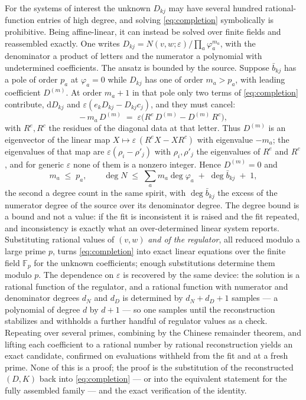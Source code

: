 \documentclass[11pt]{article}
\newcommand{\eps}{\varepsilon}
\newcommand{\dd}{\mathrm{d}}
\newcommand{\Fp}{\mathbb{F}_p}
\begin{document}
For the systems of interest the unknown $D_{kj}$ may have several
hundred rational-function entries of high degree, and solving
\eqref{eq:completion} symbolically is prohibitive.  Being affine-linear,
it
can instead be solved over finite fields and reassembled exactly.
One writes
$D_{kj} = N(v,w;\eps)\big/\prod_a \varphi_a^{m_a}$, with the
denominator a product of letters and the numerator a polynomial with
undetermined coefficients.  The ansatz is bounded by the source.
Suppose $\bar b_{kj}$ has a pole of order $p_a$ at $\varphi_a = 0$
while $D_{kj}$ has one of order $m_a > p_a$, with leading coefficient
$D^{(m)}$.  At order $m_a + 1$ in that pole only two terms of
\eqref{eq:completion} contribute, $\dd D_{kj}$ and
$\eps(e_k D_{kj} - D_{kj}c_j)$, and they must cancel:
\begin{equation}
  -\,m_a\, D^{(m)} \;=\; \eps\big(R^e\,D^{(m)} - D^{(m)}\,R^c\big) ,
\end{equation}
with $R^e, R^c$ the residues of the diagonal data at that letter.
Thus $D^{(m)}$ is an eigenvector of the linear map
$X \mapsto \eps\,(R^eX - XR^c)$ with eigenvalue $-m_a$; the
eigenvalues of that map are $\eps(\rho_i - \rho'_j)$ with
$\rho_i, \rho'_j$ the eigenvalues of $R^e$ and $R^c$, and for generic
$\eps$ none of them is a nonzero integer.  Hence $D^{(m)} = 0$ and
\begin{equation}
  m_a \;\le\; p_a ,
  \qquad
  \deg N \;\le\; \sum_a m_a \deg\varphi_a
  \;+\; \deg\bar b_{kj} \;+\; 1 ,
\end{equation}
the second a degree count in the same spirit, with
$\deg \bar b_{kj}$ the excess of the numerator degree of the source
over its denominator degree.  The degree bound is a bound and not a
value: if the fit is inconsistent it is raised and the fit repeated,
and inconsistency is exactly what an over-determined linear system
reports.  Substituting rational values of $(v,w)$ \emph{and of
the regulator}, all reduced modulo a large prime $p$, turns
\eqref{eq:completion} into exact linear equations over the finite
field $\Fp$ for the unknown coefficients; enough substitutions
determine them modulo $p$.  The dependence on $\eps$ is recovered by
the same device: the solution is a rational function of the
regulator, and a rational function with numerator and denominator
degrees $d_N$ and $d_D$ is determined by $d_N + d_D + 1$ samples ---
a polynomial of degree $d$ by $d+1$ --- so one samples until the
reconstruction stabilizes and withholds a further handful of
regulator values as a check.  Repeating over several primes,
combining by the Chinese remainder theorem, and lifting each
coefficient to a rational number by rational reconstruction yields
an exact candidate, confirmed on evaluations withheld from the fit
and at a fresh prime.  None of this is a proof; the proof is the
substitution of the reconstructed $(D, K)$ back into
\eqref{eq:completion} --- or into the equivalent statement for the
fully assembled family --- and the exact verification of the
identity.
\end{document}
